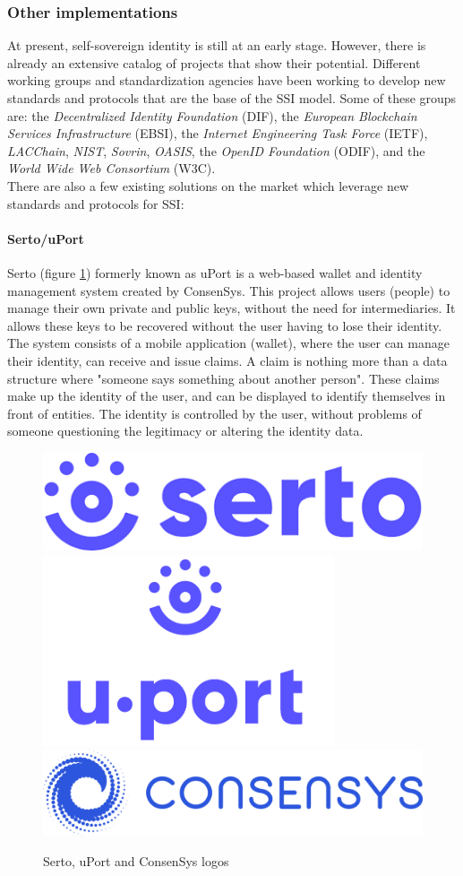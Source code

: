\documentclass[a4paper, 12pt]{article} %
\begin{document}
            \subsubsection{Other implementations}
                At present, self-sovereign identity is still at an early stage. However, there is already an extensive catalog of projects that show their potential. Different working groups and standardization agencies have been working to develop new standards and protocols that are the base of the SSI model\cite{ssi-wallets}. Some of these groups are: the \textit{Decentralized Identity Foundation} (DIF), the \textit{European Blockchain Services Infrastructure} (EBSI), the \textit{Internet Engineering Task Force} (IETF), \textit{LACChain}, \textit{NIST}, \textit{Sovrin}, \textit{OASIS}, the \textit{OpenID Foundation} (ODIF), and the \textit{World Wide Web Consortium} (W3C).\\
                
                There are also a few existing solutions on the market which leverage new standards and protocols for SSI:
                \paragraph{Serto/uPort}
                    Serto\cite{serto} (figure \ref{fig:uport}) formerly known as uPort\cite{uport} is a web-based wallet and identity management system created by ConsenSys\cite{consenSys}. This project allows users (people) to manage their own private and public keys, without the need for intermediaries. It allows these keys to be recovered without the user having to lose their identity. The system consists of a mobile application (wallet), where the user can manage their identity, can receive and issue claims. A claim is nothing more than a data structure where "someone says something about another person". These claims make up the identity of the user, and can be displayed to identify themselves in front of entities. The identity is controlled by the user, without problems of someone questioning the legitimacy or altering the identity data.
                    \begin{figure}[h]
                        \centering
                        \includegraphics[width=.2\textwidth]{serto-logo.png}\hfill
                        \includegraphics[width=.2\textwidth]{uport-logo.png}\hfill
                        \includegraphics[width=.3\textwidth]{consensys-horizontal-logo.png}
                        \caption{Serto, uPort and ConsenSys logos}
                        \label{fig:uport}
                    \end{figure}
                    
\end{document}

